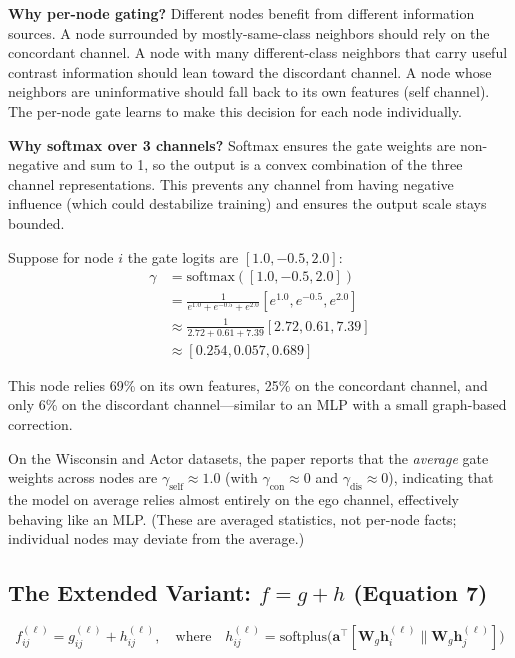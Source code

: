\documentclass[11pt,a4paper]{article}
\newcommand{\bW}{\mathbf{W}}
\newcommand{\bh}{\mathbf{h}}
\theoremstyle{definition}
\theoremstyle{plain}
\begin{document}
\textbf{Why per-node gating?}
Different nodes benefit from different information sources.
A node surrounded by mostly-same-class neighbors should rely on the concordant
channel. A node with many different-class neighbors that carry useful contrast
information should lean toward the discordant channel. A node whose neighbors
are uninformative should fall back to its own features (self channel).
The per-node gate learns to make this decision for each node individually.

\textbf{Why softmax over 3 channels?}
Softmax ensures the gate weights are non-negative and sum to 1, so the output is
a convex combination of the three channel representations.
This prevents any channel from having negative influence (which could destabilize
training) and ensures the output scale stays bounded.

\begin{example}
Suppose for node $i$ the gate logits are $[1.0, -0.5, 2.0]$:
\begin{align*}
  \gamma &= \mathrm{softmax}([1.0, -0.5, 2.0]) \\
  &= \frac{1}{e^{1.0} + e^{-0.5} + e^{2.0}} [e^{1.0}, e^{-0.5}, e^{2.0}] \\
  &\approx \frac{1}{2.72 + 0.61 + 7.39}[2.72, 0.61, 7.39] \\
  &\approx [0.254, 0.057, 0.689]
\end{align*}

This node relies 69\% on its own features, 25\% on the concordant channel,
and only 6\% on the discordant channel---similar to an MLP with a small
graph-based correction.

On the Wisconsin and Actor datasets, the paper reports that the
\emph{average} gate weights across nodes are
$\gamma_{\text{self}} \approx 1.0$ (with $\gamma_{\text{con}} \approx 0$
and $\gamma_{\text{dis}} \approx 0$), indicating that the model
on average relies almost entirely on the ego channel, effectively
behaving like an MLP.
(These are averaged statistics, not per-node facts; individual nodes
may deviate from the average.)
\end{example}


\subsection{The Extended Variant: $f = g + h$ (Equation 7)}
\label{sec:extended}

\begin{equation}
  f_{ij}^{(\ell)} = g_{ij}^{(\ell)} + h_{ij}^{(\ell)}, \quad\text{where}\quad
  h_{ij}^{(\ell)} = \mathrm{softplus}\bigl(\mathbf{a}^\top [\bW_g \bh_i^{(\ell)} \| \bW_g \bh_j^{(\ell)}]\bigr)
  \tag{Eq.~7}
\end{equation}
\end{document}
